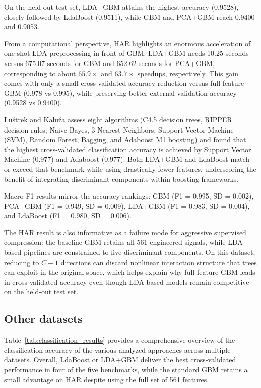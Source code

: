 \documentclass[11pt,a4paper]{article}
\begin{document}
On the held-out test set, LDA+GBM attains the highest accuracy (0.9528), closely followed by LdaBoost (0.9511), while GBM and PCA+GBM reach 0.9400 and 0.9053.

From a computational perspective, HAR highlights an enormous acceleration of one-shot LDA preprocessing in front of GBM: LDA+GBM needs 10.25 seconds versus 675.07 seconds for GBM and 652.62 seconds for PCA+GBM, corresponding to about $65.9\times$ and $63.7\times$ speedups, respectively. This gain comes with only a small cross-validated accuracy reduction versus full-feature GBM (0.978 vs 0.995), while preserving better external validation accuracy (0.9528 vs 0.9400).

Luštrek and Kaluža \citep{luvstrek2009fall} assess eight algorithms (C4.5 decision trees, RIPPER decision rules, Naive Bayes, 3-Nearest Neighbors, Support Vector Machine (SVM), Random Forest, Bagging, and Adaboost M1 boosting) and found that the highest cross-validated classification accuracy is achieved by Support Vector Machine (0.977) and Adaboost (0.977). Both LDA+GBM and LdaBoost match or exceed that benchmark while using drastically fewer features, underscoring the benefit of integrating discriminant components within boosting frameworks.

Macro-F1 results mirror the accuracy rankings: GBM (F1 = 0.995, SD = 0.002), PCA+GBM (F1 = 0.949, SD = 0.009), LDA+GBM (F1 = 0.983, SD = 0.004), and LdaBoost (F1 = 0.980, SD = 0.006).

The HAR result is also informative as a failure mode for aggressive supervised compression: the baseline GBM retains all 561 engineered signals, while LDA-based pipelines are constrained to five discriminant components. On this dataset, reducing to $C-1$ directions can discard nonlinear interaction structure that trees can exploit in the original space, which helps explain why full-feature GBM leads in cross-validated accuracy even though LDA-based models remain competitive on the held-out test set.


\subsection*{Other datasets}

Table~\ref{tab:classification_results} provides a comprehensive overview of the classification accuracy of the various analyzed approaches across multiple datasets. Overall, LdaBoost or LDA+GBM deliver the best cross-validated performance in four of the five benchmarks, while the standard GBM retains a small advantage on HAR despite using the full set of 561 features.
\end{document}
